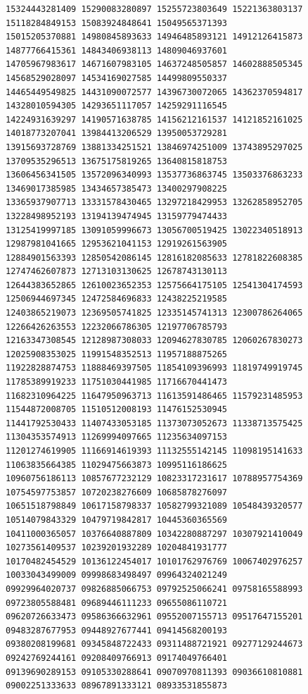 \documentclass[10pt]{article}
\begin{document}
\begin{verbatim}
15324443281409 15290083280897 15255723803649 15221363803137 15118284849153 15083924848641 15049565371393
15015205370881 14980845893633 14946485893121 14912126415873 14877766415361 14843406938113 14809046937601
14705967983617 14671607983105 14637248505857 14602888505345 14568529028097 14534169027585 14499809550337
14465449549825 14431090072577 14396730072065 14362370594817 14328010594305 14293651117057 14259291116545
14224931639297 14190571638785 14156212161537 14121852161025 14018773207041 13984413206529 13950053729281
13915693728769 13881334251521 13846974251009 13743895297025 13709535296513 13675175819265 13640815818753
13606456341505 13572096340993 13537736863745 13503376863233 13469017385985 13434657385473 13400297908225
13365937907713 13331578430465 13297218429953 13262858952705 13228498952193 13194139474945 13159779474433
13125419997185 13091059996673 13056700519425 13022340518913 12987981041665 12953621041153 12919261563905
12884901563393 12850542086145 12816182085633 12781822608385 12747462607873 12713103130625 12678743130113
12644383652865 12610023652353 12575664175105 12541304174593 12506944697345 12472584696833 12438225219585
12403865219073 12369505741825 12335145741313 12300786264065 12266426263553 12232066786305 12197706785793
12163347308545 12128987308033 12094627830785 12060267830273 12025908353025 11991548352513 11957188875265
11922828874753 11888469397505 11854109396993 11819749919745 11785389919233 11751030441985 11716670441473
11682310964225 11647950963713 11613591486465 11579231485953 11544872008705 11510512008193 11476152530945
11441792530433 11407433053185 11373073052673 11338713575425 11304353574913 11269994097665 11235634097153
11201274619905 11166914619393 11132555142145 11098195141633 11063835664385 11029475663873 10995116186625
10960756186113 10857677232129 10823317231617 10788957754369 10754597753857 10720238276609 10685878276097
10651518798849 10617158798337 10582799321089 10548439320577 10514079843329 10479719842817 10445360365569
10411000365057 10376640887809 10342280887297 10307921410049 10273561409537 10239201932289 10204841931777
10170482454529 10136122454017 10101762976769 10067402976257 10033043499009 09998683498497 09964324021249
09929964020737 09826885066753 09792525066241 09758165588993 09723805588481 09689446111233 09655086110721
09620726633473 09586366632961 09552007155713 09517647155201 09483287677953 09448927677441 09414568200193
09380208199681 09345848722433 09311488721921 09277129244673 09242769244161 09208409766913 09174049766401
09139690289153 09105330288641 09070970811393 09036610810881 09002251333633 08967891333121 08933531855873

\end{verbatim}
\end{document}
